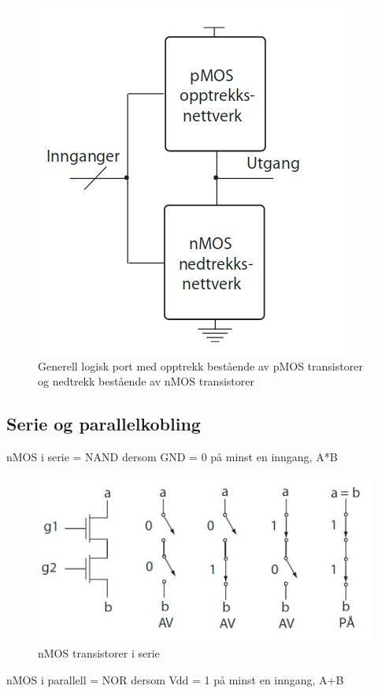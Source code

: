 \documentclass{article}
\begin{document}
	\begin{figure}[H]
		\includegraphics[scale = 0.6]{OPPned.jpg}
		\caption{Generell logisk port med opptrekk bestående av pMOS transistorer og nedtrekk bestående av nMOS transistorer}
	\end{figure}
	
	\subsection{Serie og parallelkobling}
	nMOS i serie = NAND dersom GND = 0 på minst en inngang, A*B
	
	\begin{figure}[H]
		\includegraphics[scale = 0.6]{nMOSserie.jpg}
		\caption{nMOS transistorer i serie}
	\end{figure}
	
	nMOS i parallell = NOR dersom Vdd = 1 på minst en inngang, A+B
	
\end{document}
